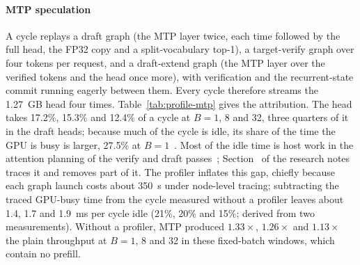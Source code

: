 \paragraph{MTP speculation} A cycle replays a draft graph (the MTP layer twice, each time followed by the full head, the FP32 copy and a split-vocabulary top-1), a target-verify graph over four tokens per request, and a draft-extend graph (the MTP layer over the verified tokens and the head once more), with verification and the recurrent-state commit running eagerly between them. Every cycle therefore streams the 1.27~GB head four times. Table~\ref{tab:profile-mtp} gives the attribution. The head takes 17.2\%, 15.3\% and 12.4\% of a cycle at $B=1$, 8 and 32, three quarters of it in the draft heads; because much of the cycle is idle, its share of the time the GPU is busy is larger, 27.5\% at $B=1$~. Most of the idle time is host work in the attention planning of the verify and draft passes~; Section~ of the research notes traces it and removes part of it. The profiler inflates this gap, chiefly because each graph launch costs about 350~\textmu s under node-level tracing; subtracting the traced GPU-busy time from the cycle measured without a profiler leaves about 1.4, 1.7 and 1.9~ms per cycle idle (21\%, 20\% and 15\%; derived from two measurements). Without a profiler, MTP produced $1.33\times$, $1.26\times$ and $1.13\times$ the plain throughput at $B=1$, 8 and 32 in these fixed-batch windows, which contain no prefill.

